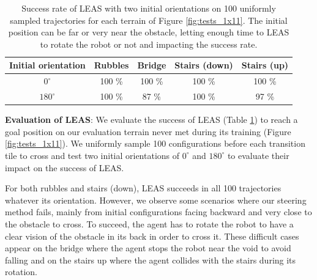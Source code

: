 \begin{table}[h!]
\centering
\begin{tabular}{ |c|c|c|c|c| } 
    \hline
    Initial orientation & Rubbles & Bridge & Stairs (down) & Stairs (up) \\ 
    \hline
    $0^{\circ}$ & 100 \% & 100 \% & 100 \% & 100 \%  \\ 
    \hline
    $180^{\circ}$ & 100 \% & 87 \% & 100 \% & 97 \% \\
    \hline
\end{tabular}
\caption{Success rate of LEAS with two initial orientations on 100 uniformly sampled trajectories for each terrain of Figure \ref{fig:tests_1x11}. The initial position can be far or very near the obstacle, letting enough time to LEAS to rotate the robot or not and impacting the success rate.}
\label{tab:tests_1x11}
\end{table}

\textbf{Evaluation of LEAS}: We evaluate the success of LEAS (Table \ref{tab:tests_1x11}) to reach a goal position on our evaluation terrain never met during its training (Figure \ref{fig:tests_1x11}).
We uniformly sample 100 configurations before each transition tile to cross and test two initial orientations of $0^{\circ}$ and $180^{\circ}$ to evaluate their impact on the success of LEAS. 

For both rubbles and stairs (down), LEAS succeeds in all 100 trajectories whatever its orientation. 
However, we observe some scenarios where our steering method fails, mainly from initial configurations facing backward and very close to the obstacle to cross. To succeed, the agent has to rotate the robot to have a clear vision of the obstacle in its back in order to cross it. 
These difficult cases appear on the bridge where the agent stops the robot near the void to avoid falling and on the stairs up where the agent collides with the stairs during its rotation.

